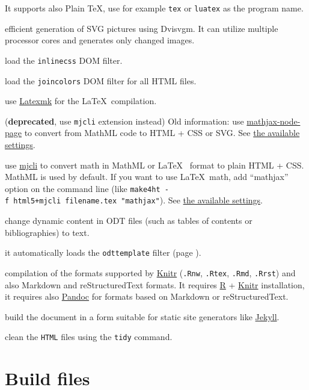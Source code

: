 \begin{description}
It supports also Plain \TeX, use for example \texttt{tex} or
\texttt{luatex} as the program name.
\item[dvisvgm\_hashes]
efficient generation of SVG pictures using Dvisvgm. It can utilize
multiple processor cores and generates only changed images.
\item[inlinecss]
load the \texttt{inlinecss} DOM filter.
\item[join\_colors]
load the \texttt{joincolors} DOM filter for all HTML files.
\item[latexmk\_build]
use \href{https://ctan.org/pkg/latexmk?lang=en}{Latexmk} for the
\LaTeX~compilation.
\item[mathjaxnode]
(\textbf{deprecated}, use \texttt{mjcli} extension instead) Old
information: use
\href{https://github.com/pkra/mathjax-node-page/}{mathjax-node-page} to
convert from MathML code to HTML + CSS or SVG. See
\hyperref[mathjaxsettings]{the available settings}.
\item[mjcli]
use \href{https://github.com/michal-h21/mjcli}{mjcli} to convert math in
MathML or \LaTeX~ format to plain HTML + CSS. MathML is used by default.
If you want to use \LaTeX~math, add ``mathjax'' option on the command
line (like \texttt{make4ht\ -f\ html5+mjcli\ filename.tex\ "mathjax"}).
See \hyperref[mathjaxsettings]{the available settings}.
\item[nodynamicodt]
change dynamic content in ODT files (such as tables of contents or
bibliographies) to text.
\item[odttemplate]
it automatically loads the \texttt{odttemplate} filter (page
\pageref{sec:odttemplate}).
\item[preprocess\_input]
compilation of the formats supported by
\href{https://yihui.name/knitr/}{Knitr} (\texttt{.Rnw}, \texttt{.Rtex},
\texttt{.Rmd}, \texttt{.Rrst}) and also Markdown and reStructuredText
formats. It requires \href{https://www.r-project.org/}{R} +
\href{https://yihui.name/knitr/}{Knitr} installation, it requires also
\href{https://pandoc.org/}{Pandoc} for formats based on Markdown or
reStructuredText.
\item[staticsite]
build the document in a form suitable for static site generators like
\href{https://jekyllrb.com/}{Jekyll}.
\item[tidy]
clean the \texttt{HTML} files using the \texttt{tidy} command.
\end{description}

\section{Build files}\label{build-files}

